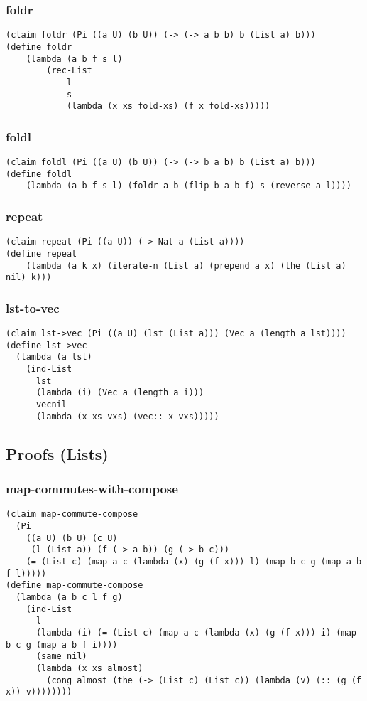 \subsubsection{foldr} \label{code:foldr}
\begin{lstlisting}
(claim foldr (Pi ((a U) (b U)) (-> (-> a b b) b (List a) b)))
(define foldr
    (lambda (a b f s l)
        (rec-List 
            l
            s
            (lambda (x xs fold-xs) (f x fold-xs)))))
\end{lstlisting}

\subsubsection{foldl} \label{code:foldl}
\begin{lstlisting}
(claim foldl (Pi ((a U) (b U)) (-> (-> b a b) b (List a) b)))
(define foldl
    (lambda (a b f s l) (foldr a b (flip b a b f) s (reverse a l))))
\end{lstlisting}

\subsubsection{repeat} \label{code:repeat}
\begin{lstlisting}
(claim repeat (Pi ((a U)) (-> Nat a (List a))))
(define repeat
    (lambda (a k x) (iterate-n (List a) (prepend a x) (the (List a) nil) k)))
\end{lstlisting}


\subsubsection{lst-to-vec} \label{code:lst-to-vec}
\begin{lstlisting}
(claim lst->vec (Pi ((a U) (lst (List a))) (Vec a (length a lst))))
(define lst->vec
  (lambda (a lst)
    (ind-List
      lst
      (lambda (i) (Vec a (length a i)))
      vecnil
      (lambda (x xs vxs) (vec:: x vxs)))))
\end{lstlisting}

\subsection{Proofs (Lists)}
\subsubsection{map-commutes-with-compose} \label{code:map-commutes-with-compose}
\begin{lstlisting}
(claim map-commute-compose
  (Pi
    ((a U) (b U) (c U)
     (l (List a)) (f (-> a b)) (g (-> b c)))
    (= (List c) (map a c (lambda (x) (g (f x))) l) (map b c g (map a b f l)))))
(define map-commute-compose
  (lambda (a b c l f g)
    (ind-List
      l
      (lambda (i) (= (List c) (map a c (lambda (x) (g (f x))) i) (map b c g (map a b f i))))
      (same nil)
      (lambda (x xs almost)
        (cong almost (the (-> (List c) (List c)) (lambda (v) (:: (g (f x)) v))))))))
\end{lstlisting}

